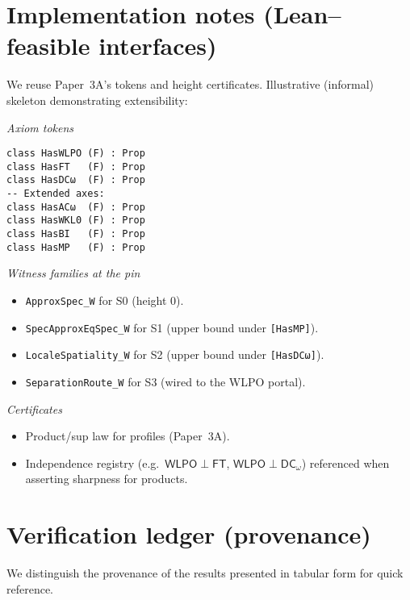 \documentclass[11pt]{article}
\newcommand{\WLPO}{\mathsf{WLPO}}
\newcommand{\FT}{\mathsf{FT}}
\newcommand{\DCw}{\mathsf{DC}_{\omega}}
\theoremstyle{plain}
\theoremstyle{definition}
\theoremstyle{remark}
\begin{document}
\section{Implementation notes (Lean--feasible interfaces)}

We reuse Paper~3A's tokens and height certificates. Illustrative (informal) skeleton demonstrating extensibility:

\medskip
\noindent\emph{Axiom tokens}
\begin{verbatim}
class HasWLPO (F) : Prop
class HasFT   (F) : Prop
class HasDCω  (F) : Prop
-- Extended axes:
class HasACω  (F) : Prop
class HasWKL0 (F) : Prop
class HasBI   (F) : Prop
class HasMP   (F) : Prop
\end{verbatim}

\noindent\emph{Witness families at the pin}
\begin{itemize}
  \item \texttt{ApproxSpec\_W} for S0 (height 0).
  \item \texttt{SpecApproxEqSpec\_W} for S1 (upper bound under \texttt{[HasMP]}).
  \item \texttt{LocaleSpatiality\_W} for S2 (upper bound under \texttt{[HasDCω]}).
  \item \texttt{SeparationRoute\_W} for S3 (wired to the WLPO portal).
\end{itemize}

\noindent\emph{Certificates}
\begin{itemize}
  \item Product/sup law for profiles (Paper~3A).
  \item Independence registry (e.g.\ $\WLPO\perp \FT$, $\WLPO\perp \DCw$) referenced when asserting sharpness for products.
\end{itemize}

\section{Verification ledger (provenance)}\label{sec:ledger}

We distinguish the provenance of the results presented in tabular form for quick reference.
\end{document}
